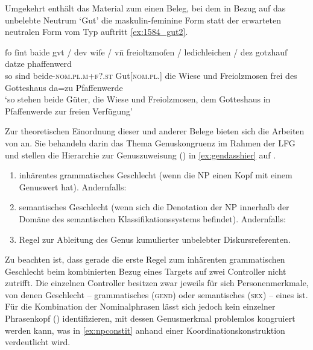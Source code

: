 Umgekehrt enthält das Material zum \CAO{} einen Beleg, bei dem in
Bezug auf das un\-belebte Neutrum  `Gut' die maskulin-feminine
Form  statt der erwarteten neutralen Form vom Typ 
auftritt \cref{ex:1584_gut2}.

\begin{exe}
\ex\label{ex:1584_gut2}
	\gll ſo ſint baide gvt / dev wiſe / vn̄ freioltzmoſen /
			ledichleichen / dez gotzhauſ datze phaffenwerd \\
		so sind beide-\textsc{nom.pl.m+f?\subI.st} Gut[\textsc{nom.pl.\NeutI}] {} die
			Wiese {} und Freiolzmosen {} frei {} des Gotteshaus da=zu
			Pfaffenwerde \\
	\trans `so stehen beide Güter, die Wiese und Freiolzmosen, dem
		Gotteshaus in Pfaffenwerde zur freien Verfügung'
		\parencites(Nr.~1584, Kl.~Herrenchiemsee, Kr.~Rosenheim, 1292)[727,26--27]{cao2}
\end{exe}

Zur theoretischen Einordnung dieser und anderer Belege bieten sich die Arbeiten
von \textcites[171--195]{wechslerzlatic2003}{wechsler2009} an. Sie behandeln
darin das Thema Genus\-kongruenz im Rahmen der LFG \autocites(vgl.~%
\cref{sec:lfgkongr}){bresnanetal2016} und stellen die Hierarchie zur
Genuszuweisung () in \cref{ex:gendasshier} auf
\autocites[584]{wechsler2009}[195]{wechslerzlatic2003}.

\begin{exe}
\ex\label{ex:gendasshier}
	\begin{enumerate}[noitemsep]
		\item inhärentes grammatisches Geschlecht (wenn die NP einen Kopf
			mit einem Genuswert hat). Andernfalls:
		\item semantisches Geschlecht (wenn sich die Denotation der NP
			innerhalb der Domäne des semantischen Klassifikationssystems
			befindet). Andernfalls:
		\item Regel zur Ableitung des Genus kumulierter unbelebter 
			Diskursreferenten.
	\end{enumerate}
\end{exe}

Zu beachten ist, dass gerade die erste Regel zum inhärenten grammatischen
Geschlecht beim kombinierten Bezug eines Targets auf zwei Controller nicht
zutrifft. Die einzelnen Controller besitzen zwar jeweils für sich
Personenmerkmale, von denen Geschlecht -- grammatisches (\textsc{gend}) oder
semantisches (\textsc{sex}) -- eines ist. Für die Kombination der Nominalphrasen lässt
sich jedoch kein einzelner Phrasenkopf () identifizieren, mit dessen
Genusmerkmal problemlos kongruiert werden kann, was in \cref{ex:npconstit}
anhand einer Koordinations\-konstruktion verdeutlicht wird.

